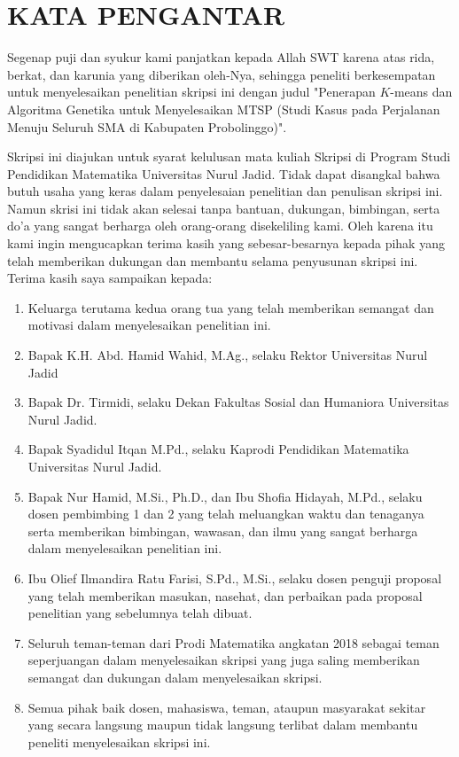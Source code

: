 \newpage
\chapter*{KATA PENGANTAR}

Segenap puji dan syukur kami panjatkan kepada Allah SWT karena atas rida, berkat, dan karunia yang diberikan oleh-Nya, sehingga peneliti berkesempatan untuk menyelesaikan penelitian skripsi ini dengan judul "Penerapan $K$-means dan Algoritma Genetika untuk Menyelesaikan MTSP (Studi Kasus pada Perjalanan Menuju Seluruh SMA di Kabupaten Probolinggo)".

Skripsi ini diajukan untuk syarat kelulusan mata kuliah Skripsi di Program Studi Pendidikan Matematika Universitas Nurul Jadid. Tidak dapat disangkal bahwa butuh usaha yang keras dalam penyelesaian penelitian dan penulisan skripsi ini. Namun skrisi ini tidak akan selesai tanpa bantuan, dukungan, bimbingan, serta do'a yang sangat berharga oleh orang-orang disekeliling kami. Oleh karena itu kami ingin mengucapkan terima kasih yang sebesar-besarnya kepada pihak yang telah memberikan dukungan dan membantu selama penyusunan skripsi ini. Terima kasih saya sampaikan kepada:

\begin{enumerate}
	\item Keluarga terutama kedua orang tua yang telah memberikan semangat dan motivasi dalam menyelesaikan penelitian ini.
	\item Bapak K.H. Abd. Hamid Wahid, M.Ag., selaku Rektor Universitas Nurul Jadid
	\item Bapak Dr. Tirmidi, selaku Dekan Fakultas Sosial dan Humaniora Universitas Nurul Jadid.
	\item Bapak Syadidul Itqan M.Pd., selaku Kaprodi Pendidikan Matematika Universitas Nurul Jadid.
	\item Bapak Nur Hamid, M.Si., Ph.D., dan Ibu Shofia Hidayah, M.Pd., selaku dosen pembimbing 1 dan 2 yang telah meluangkan waktu dan tenaganya serta memberikan bimbingan, wawasan, dan ilmu yang sangat berharga dalam menyelesaikan penelitian ini.
	\item Ibu Olief Ilmandira Ratu Farisi, S.Pd., M.Si., selaku dosen penguji proposal yang telah memberikan masukan, nasehat, dan perbaikan pada proposal penelitian yang sebelumnya telah dibuat.
	\item Seluruh teman-teman dari Prodi Matematika angkatan 2018 sebagai teman seperjuangan dalam menyelesaikan skripsi yang juga saling memberikan semangat dan dukungan dalam menyelesaikan skripsi.
	\item Semua pihak baik dosen, mahasiswa, teman, ataupun masyarakat sekitar yang secara langsung maupun tidak langsung terlibat dalam membantu peneliti menyelesaikan skripsi ini.
\end{enumerate}

